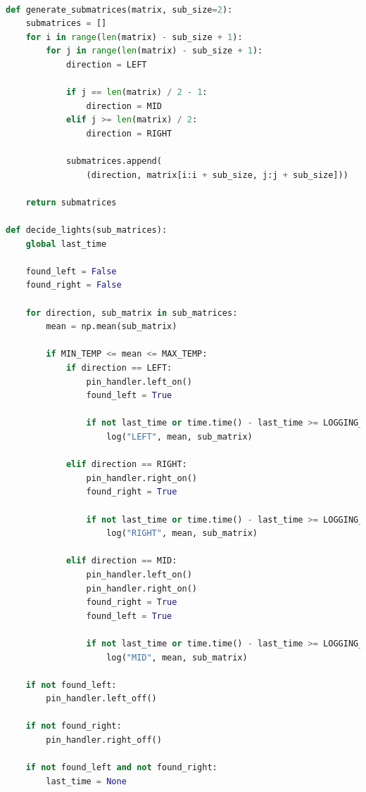 \begin{latin}
\begin{lstlisting}[language=python]

def generate_submatrices(matrix, sub_size=2):
    submatrices = []
    for i in range(len(matrix) - sub_size + 1):
        for j in range(len(matrix) - sub_size + 1):
            direction = LEFT

            if j == len(matrix) / 2 - 1:
                direction = MID
            elif j >= len(matrix) / 2:
                direction = RIGHT

            submatrices.append(
                (direction, matrix[i:i + sub_size, j:j + sub_size]))

    return submatrices

def decide_lights(sub_matrices):
    global last_time

    found_left = False
    found_right = False

    for direction, sub_matrix in sub_matrices:
        mean = np.mean(sub_matrix)

        if MIN_TEMP <= mean <= MAX_TEMP:
            if direction == LEFT:
                pin_handler.left_on()
                found_left = True

                if not last_time or time.time() - last_time >= LOGGING_PERIOD:
                    log("LEFT", mean, sub_matrix)

            elif direction == RIGHT:
                pin_handler.right_on()
                found_right = True

                if not last_time or time.time() - last_time >= LOGGING_PERIOD:
                    log("RIGHT", mean, sub_matrix)

            elif direction == MID:
                pin_handler.left_on()
                pin_handler.right_on()
                found_right = True
                found_left = True

                if not last_time or time.time() - last_time >= LOGGING_PERIOD:
                    log("MID", mean, sub_matrix)

    if not found_left:
        pin_handler.left_off()

    if not found_right:
        pin_handler.right_off()

    if not found_left and not found_right:
        last_time = None



\end{lstlisting}
\end{latin}

